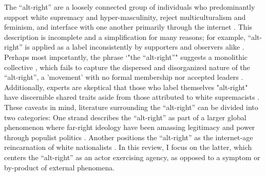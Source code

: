 \documentclass[acmlarge, screen, authorversion]{acmart}
\begin{document}
The ``alt-right” are a loosely connected group of individuals who predominantly support white supremacy and hyper-masculinity, reject multiculturalism and feminism, and interface with one another primarily through the internet
\cite{sternProudBoysWhite2019, mainRiseAltRight2018, nagleKillAllNormies2017, hawleyMakingSenseAltright2017}. 
This description is incomplete and a simplification for
many reasons; for example, ``alt-right'' is applied as a label inconsistently by supporters and observers alike \cite{hawleyMakingSenseAltright2017}. Perhaps most importantly, the phrase `"the ``alt-right''" suggests a monolithic collective \cite{massanariRethinkingResearchEthics2018}, which fails to capture the dispersed and disorganized \cite{martinDissectingTrumpMost2017} nature of the ``alt-right'', a 'movement' with no formal membership nor accepted leaders \cite{hawleyMakingSenseAltright2017}. Additionally, experts are skeptical that those who label themselves "alt-right" have discernible shared traits aside from those attributed to white supremacists
\cite{gallaherMainstreamingWhiteSupremacy2020, johndaniszewskiWritingAltright2016}.  These caveats in mind, literature surrounding the ``alt-right” can be divided into two categories: One strand describes the ``alt-right'' as part
of a larger global phenomenon where far-right ideology have been
amassing legitimacy and power through populist politics \cite{cammaertsMainstreamingExtremeRightWing2018, worthMorbidSymptomsGlobal2019}. Another positions the
``alt-right” as the internet-age reincarnation of white nationalists
\cite{hawleyMakingSenseAltright2017, mainRiseAltRight2018}. In this review,
I focus on the latter, which centers the ``alt-right'' as an actor exercising agency, as opposed to a symptom or by-product of external phenomena.
\end{document}
